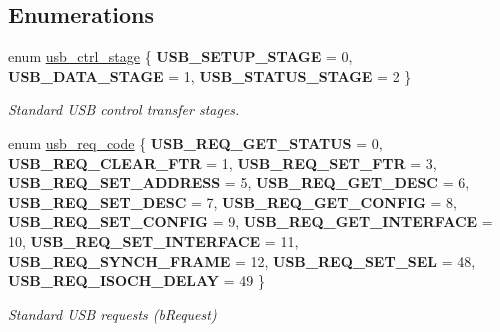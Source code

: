 \subsection*{Enumerations}
\begin{DoxyCompactItemize}
\item 
\mbox{\label{group__usb__protocol__group_ga99e4dd2388e6ffd6bf38a6589d141989}} 
enum \hyperlink{group__usb__protocol__group_ga99e4dd2388e6ffd6bf38a6589d141989}{usb\+\_\+ctrl\+\_\+stage} \{ {\bfseries U\+S\+B\+\_\+\+S\+E\+T\+U\+P\+\_\+\+S\+T\+A\+GE} = 0, 
{\bfseries U\+S\+B\+\_\+\+D\+A\+T\+A\+\_\+\+S\+T\+A\+GE} = 1, 
{\bfseries U\+S\+B\+\_\+\+S\+T\+A\+T\+U\+S\+\_\+\+S\+T\+A\+GE} = 2
 \}\begin{DoxyCompactList}\small\item\em Standard U\+SB control transfer stages. \end{DoxyCompactList}
\item 
\mbox{\label{group__usb__protocol__group_gab10ff428a015f6a3cff0e2c49da86adc}} 
enum \hyperlink{group__usb__protocol__group_gab10ff428a015f6a3cff0e2c49da86adc}{usb\+\_\+req\+\_\+code} \{ \newline
{\bfseries U\+S\+B\+\_\+\+R\+E\+Q\+\_\+\+G\+E\+T\+\_\+\+S\+T\+A\+T\+US} = 0, 
{\bfseries U\+S\+B\+\_\+\+R\+E\+Q\+\_\+\+C\+L\+E\+A\+R\+\_\+\+F\+TR} = 1, 
{\bfseries U\+S\+B\+\_\+\+R\+E\+Q\+\_\+\+S\+E\+T\+\_\+\+F\+TR} = 3, 
{\bfseries U\+S\+B\+\_\+\+R\+E\+Q\+\_\+\+S\+E\+T\+\_\+\+A\+D\+D\+R\+E\+SS} = 5, 
\newline
{\bfseries U\+S\+B\+\_\+\+R\+E\+Q\+\_\+\+G\+E\+T\+\_\+\+D\+E\+SC} = 6, 
{\bfseries U\+S\+B\+\_\+\+R\+E\+Q\+\_\+\+S\+E\+T\+\_\+\+D\+E\+SC} = 7, 
{\bfseries U\+S\+B\+\_\+\+R\+E\+Q\+\_\+\+G\+E\+T\+\_\+\+C\+O\+N\+F\+IG} = 8, 
{\bfseries U\+S\+B\+\_\+\+R\+E\+Q\+\_\+\+S\+E\+T\+\_\+\+C\+O\+N\+F\+IG} = 9, 
\newline
{\bfseries U\+S\+B\+\_\+\+R\+E\+Q\+\_\+\+G\+E\+T\+\_\+\+I\+N\+T\+E\+R\+F\+A\+CE} = 10, 
{\bfseries U\+S\+B\+\_\+\+R\+E\+Q\+\_\+\+S\+E\+T\+\_\+\+I\+N\+T\+E\+R\+F\+A\+CE} = 11, 
{\bfseries U\+S\+B\+\_\+\+R\+E\+Q\+\_\+\+S\+Y\+N\+C\+H\+\_\+\+F\+R\+A\+ME} = 12, 
{\bfseries U\+S\+B\+\_\+\+R\+E\+Q\+\_\+\+S\+E\+T\+\_\+\+S\+EL} = 48, 
\newline
{\bfseries U\+S\+B\+\_\+\+R\+E\+Q\+\_\+\+I\+S\+O\+C\+H\+\_\+\+D\+E\+L\+AY} = 49
 \}\begin{DoxyCompactList}\small\item\em Standard U\+SB requests (b\+Request) \end{DoxyCompactList}

\end{DoxyCompactItemize}
